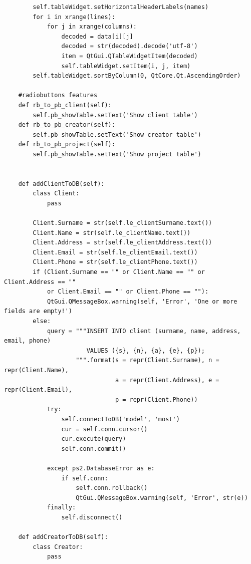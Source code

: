 \documentclass[a4paper, 12pt, titlepage]{article}
\begin{document}
\begin{otherlanguage}{russian}
\begin{lstlisting}
        self.tableWidget.setHorizontalHeaderLabels(names)
        for i in xrange(lines):
            for j in xrange(columns):
                decoded = data[i][j]
                decoded = str(decoded).decode('utf-8')    
                item = QtGui.QTableWidgetItem(decoded)
                self.tableWidget.setItem(i, j, item)
        self.tableWidget.sortByColumn(0, QtCore.Qt.AscendingOrder)

    #radiobuttons features
    def rb_to_pb_client(self):
        self.pb_showTable.setText('Show client table')
    def rb_to_pb_creator(self):
        self.pb_showTable.setText('Show creator table')
    def rb_to_pb_project(self):
        self.pb_showTable.setText('Show project table')

    
    def addClientToDB(self):
        class Client:
            pass

        Client.Surname = str(self.le_clientSurname.text())
        Client.Name = str(self.le_clientName.text())
        Client.Address = str(self.le_clientAddress.text())
        Client.Email = str(self.le_clientEmail.text())
        Client.Phone = str(self.le_clientPhone.text())
        if (Client.Surname == "" or Client.Name == "" or Client.Address == ""
            or Client.Email == "" or Client.Phone == ""):
            QtGui.QMessageBox.warning(self, 'Error', 'One or more fields are empty!')
        else:
            query = """INSERT INTO client (surname, name, address, email, phone)
                       VALUES ({s}, {n}, {a}, {e}, {p});
                    """.format(s = repr(Client.Surname), n = repr(Client.Name), 
                               a = repr(Client.Address), e = repr(Client.Email), 
                               p = repr(Client.Phone))
            try:
                self.connectToDB('model', 'most')
                cur = self.conn.cursor()
                cur.execute(query)
                self.conn.commit()
    
            except ps2.DatabaseError as e:
                if self.conn:
                    self.conn.rollback()
                    QtGui.QMessageBox.warning(self, 'Error', str(e))
            finally:
                self.disconnect()
                
    def addCreatorToDB(self):
        class Creator:
            pass
        

\end{lstlisting}
\end{otherlanguage}
\end{document}
